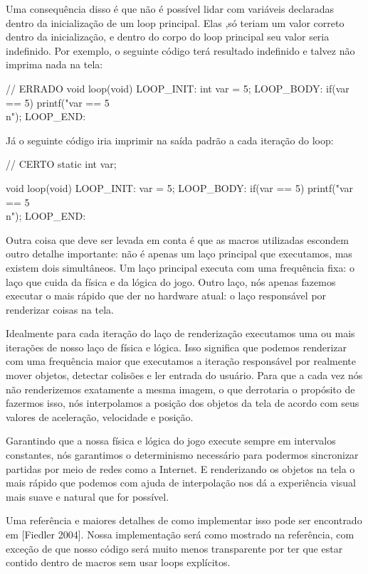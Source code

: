 Uma consequência disso é que não é possível lidar com variáveis
declaradas dentro da inicialização de um loop principal. Elas ,só
teriam um valor correto dentro da inicialização, e dentro do corpo do
loop principal seu valor seria indefinido. Por exemplo, o seguinte
código terá resultado indefinido e talvez não imprima nada na tela:

\alinhaverbatim
// ERRADO
void loop(void){
LOOP\_INIT:
  int var = 5;
LOOP\_BODY:
  if(var == 5)
    printf("var == 5\\n");
LOOP\_END:
}
\alinhanormal

Já o seguinte código iria imprimir na saída padrão a cada iteração do
loop:

\alinhaverbatim
// CERTO
static int var;

void loop(void){
LOOP\_INIT:
  var = 5;
LOOP\_BODY:
  if(var == 5)
    printf("var == 5\\n");
LOOP\_END:
}
\alinhanormal

Outra coisa que deve ser levada em conta é que as macros utilizadas
escondem outro detalhe importante: não é apenas um laço principal que
executamos, mas existem dois simultâneos. Um laço principal executa
com uma frequência fixa: o laço que cuida da física e da lógica do
jogo. Outro laço, nós apenas fazemos executar o mais rápido que der no
hardware atual: o laço responsável por renderizar coisas na tela.

Idealmente para cada iteração do laço de renderização executamos uma
ou mais iterações de nosso laço de física e lógica. Isso significa que
podemos renderizar com uma frequência maior que executamos a iteração
responsável por realmente mover objetos, detectar colisões e ler
entrada do usuário. Para que a cada vez nós não renderizemos
exatamente a mesma imagem, o que derrotaria o propósito de fazermos
isso, nós interpolamos a posição dos objetos da tela de acordo com
seus valores de aceleração, velocidade e posição.

Garantindo que a nossa física e lógica do jogo execute sempre em
intervalos constantes, nós garantimos o determinismo necessário para
podermos sincronizar partidas por meio de redes como a Internet. E
renderizando os objetos na tela o mais rápido que podemos com ajuda de
interpolação nos dá a experiência visual mais suave e natural que for
possível.

Uma referência e maiores detalhes de como implementar isso pode ser
encontrado em [Fiedler 2004]. Nossa implementação será como mostrado
na referência, com exceção de que nosso código será muito menos
transparente por ter que estar contido dentro de macros sem usar loops
explícitos.

